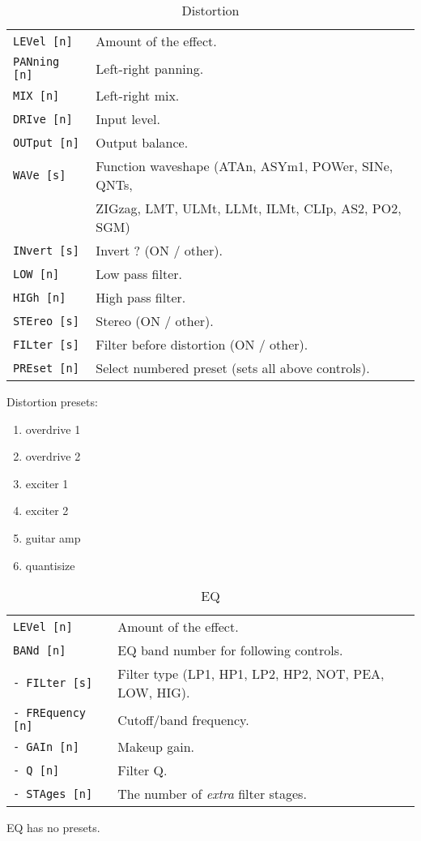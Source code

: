    \begin{table}[H]
      \centering
      \caption{Distortion}
      \begin{tabular}{l l}
\texttt{LEVel [n]} &
   Amount of the effect. \\
\texttt{PANning [n]} &
   Left-right panning. \\
\texttt{MIX [n]} &
   Left-right mix. \\
\texttt{DRIve [n]} &
   Input level. \\
\texttt{OUTput [n]} &
   Output balance. \\
\texttt{WAVe [s]} &
   Function waveshape (ATAn, ASYm1, POWer, SINe, QNTs,\\
\texttt{ } &
    ZIGzag, LMT, ULMt, LLMt, ILMt, CLIp, AS2, PO2, SGM) \\
\texttt{INvert [s]} &
   Invert ?  (ON / other). \\
\texttt{LOW [n]} &
   Low pass filter. \\
\texttt{HIGh [n]} &
   High pass filter. \\
\texttt{STEreo [s]} &
   Stereo (ON / other). \\
\texttt{FILter [s]} &
   Filter before distortion (ON / other). \\
\texttt{PREset [n]} &
   Select numbered preset (sets all above controls). \\
      \end{tabular}
   \end{table}
Distortion presets:
   \begin{enumerate}
   \item overdrive 1
   \item overdrive 2
   \item exciter 1
   \item exciter 2
   \item guitar amp
   \item quantisize
   \end{enumerate}

   \begin{table}[H]
      \centering
      \caption{EQ}
      \begin{tabular}{l l}
\texttt{LEVel [n]} &
   Amount of the effect. \\
\texttt{BANd [n]} &
   EQ band number for following controls. \\
\texttt{- FILter [s]} &
   Filter type (LP1, HP1, LP2, HP2, NOT, PEA, LOW, HIG). \\
\texttt{- FREquency [n]} &
   Cutoff/band frequency. \\
\texttt{- GAIn [n]} &
   Makeup gain. \\
\texttt{- Q [n]} &
   Filter Q. \\
\texttt{- STAges [n]} &
   The number of \textsl{extra} filter stages. \\
      \end{tabular}
   \end{table}
EQ has no presets.

